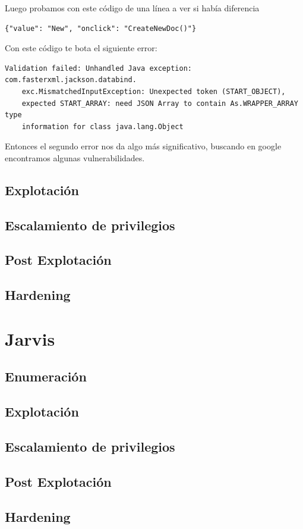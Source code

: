 \documentclass{article}
\begin{document}
Luego probamos con este código de una línea a ver si había diferencia
\begin{lstlisting}[language={[ANSI]C}]  
	{"value": "New", "onclick": "CreateNewDoc()"}
\end{lstlisting}

Con este código te bota el siguiente error:
\begin{lstlisting}[language={[ANSI]C}]  
	Validation failed: Unhandled Java exception: com.fasterxml.jackson.databind.
	exc.MismatchedInputException: Unexpected token (START_OBJECT), 
	expected START_ARRAY: need JSON Array to contain As.WRAPPER_ARRAY type 
	information for class java.lang.Object
\end{lstlisting}

Entonces el segundo error nos da algo más significativo, buscando en google encontramos algunas vulnerabilidades.
\subsection{Explotación}

\subsection{Escalamiento de privilegios}


\subsection{Post Explotación}

\subsection{Hardening}

\section{Jarvis}
\subsection{Enumeración}

\subsection{Explotación}

\subsection{Escalamiento de privilegios}


\subsection{Post Explotación}

\subsection{Hardening}
\end{document}
